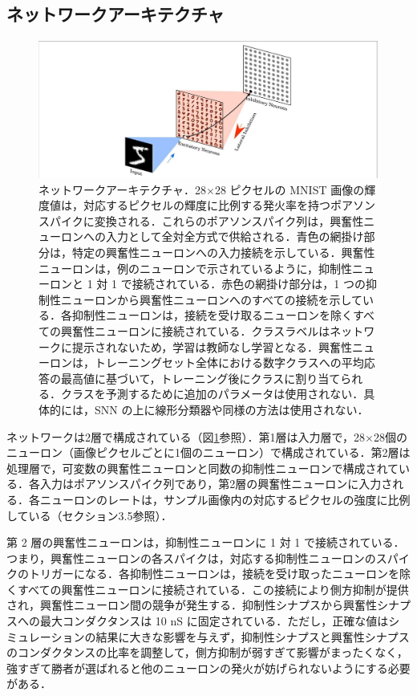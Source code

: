 \documentclass[a4paper, titlepage]{jsarticle}
\begin{document}
\subsection{ネットワークアーキテクチャ}
\begin{figure}[htbp]
   \centering
   \includegraphics[scale=0.29]{snn_architecture.jpeg}
   \caption{ネットワークアーキテクチャ．28$\times$28 ピクセルの MNIST 画像の輝度値は，対応するピクセルの輝度に比例する発火率を持つポアソンスパイクに変換される．これらのポアソンスパイク列は，興奮性ニューロンへの入力として全対全方式で供給される．青色の網掛け部分は，特定の興奮性ニューロンへの入力接続を示している．興奮性ニューロンは，例のニューロンで示されているように，抑制性ニューロンと 1 対 1 で接続されている．赤色の網掛け部分は，1 つの抑制性ニューロンから興奮性ニューロンへのすべての接続を示している．各抑制性ニューロンは，接続を受け取るニューロンを除くすべての興奮性ニューロンに接続されている．クラスラベルはネットワークに提示されないため，学習は教師なし学習となる．興奮性ニューロンは，トレーニングセット全体における数字クラスへの平均応答の最高値に基づいて，トレーニング後にクラスに割り当てられる．クラスを予測するために追加のパラメータは使用されない．具体的には，SNN の上に線形分類器や同様の方法は使用されない．}
   \label{snn_architecture}
\end{figure}
ネットワークは2層で構成されている（図\ref{snn_architecture}参照）．第1層は入力層で，28$\times$28個のニューロン（画像ピクセルごとに1個のニューロン）で構成されている．第2層は処理層で，可変数の興奮性ニューロンと同数の抑制性ニューロンで構成されている．各入力はポアソンスパイク列であり，第2層の興奮性ニューロンに入力される．各ニューロンのレートは，サンプル画像内の対応するピクセルの強度に比例している（セクション3.5参照）．
\par
第 2 層の興奮性ニューロンは，抑制性ニューロンに 1 対 1 で接続されている．つまり，興奮性ニューロンの各スパイクは，対応する抑制性ニューロンのスパイクのトリガーになる．各抑制性ニューロンは，接続を受け取ったニューロンを除くすべての興奮性ニューロンに接続されている．この接続により側方抑制が提供され，興奮性ニューロン間の競争が発生する．抑制性シナプスから興奮性シナプスへの最大コンダクタンスは 10 nS に固定されている．ただし，正確な値はシミュレーションの結果に大きな影響を与えず，抑制性シナプスと興奮性シナプスのコンダクタンスの比率を調整して，側方抑制が弱すぎて影響がまったくなく，強すぎて勝者が選ばれると他のニューロンの発火が妨げられないようにする必要がある．
\end{document}
